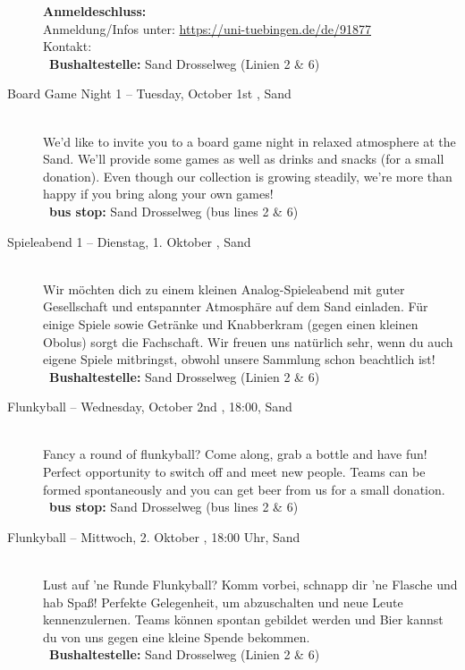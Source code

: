 \begin{description}
    \textbf{Anmeldeschluss:} \matheanmeldung\YEAR\\
    Anmeldung/Infos unter: \url{https://uni-tuebingen.de/de/91877}\\
    Kontakt: \texttt{\mathkontakt}\\
    \ifsommersemester
    ~\textbf{Bushaltestelle:} Sand Drosselweg (Linien 2 \& 6) 
    \fi
\fi


\ifml
    \item[Board Game Night 1 -- Tuesday, October 1st \YEAR, Sand]~\\%
    We'd like to invite you to a board game night in relaxed atmosphere at the Sand.
    We'll provide some games as well as drinks and snacks (for a small donation).
    Even though our collection is growing steadily, we're more than happy if you bring along your own games!\\
    ~\textbf{bus stop:} Sand Drosselweg (bus lines 2 \& 6)
\else
    \item[Spieleabend 1 -- Dienstag, 1. Oktober \YEAR, Sand]~\\%
    Wir möchten dich zu einem kleinen Analog-Spieleabend mit guter Gesellschaft und entspannter Atmosphäre auf dem Sand einladen.
    Für einige Spiele sowie Getränke und Knabberkram (gegen einen kleinen Obolus) sorgt die Fachschaft.
    Wir freuen uns natürlich sehr, wenn du auch eigene Spiele mitbringst, obwohl unsere Sammlung schon beachtlich ist!\\
    ~\textbf{Bushaltestelle:} Sand Drosselweg (Linien 2 \& 6)
\fi

\ifml
    \item[Flunkyball -- Wednesday, October 2nd \YEAR, 18:00, Sand]~\\
    Fancy a round of flunkyball? Come along, grab a bottle and have fun!
    Perfect opportunity to switch off and meet new people.
    Teams can be formed spontaneously and you can get beer from us for a small donation.\\
    ~\textbf{bus stop:} Sand Drosselweg (bus lines 2 \& 6)
\else
    \item[Flunkyball -- Mittwoch, 2. Oktober \YEAR, 18:00 Uhr, Sand]~\\
    Lust auf 'ne Runde Flunkyball? Komm vorbei, schnapp dir 'ne Flasche und hab Spaß!
    Perfekte Gelegenheit, um abzuschalten und neue Leute kennenzulernen.
    Teams können spontan gebildet werden und Bier kannst du von uns gegen eine kleine Spende bekommen.\\
    ~\textbf{Bushaltestelle:} Sand Drosselweg (Linien 2 \& 6)
\fi


\end{description}

